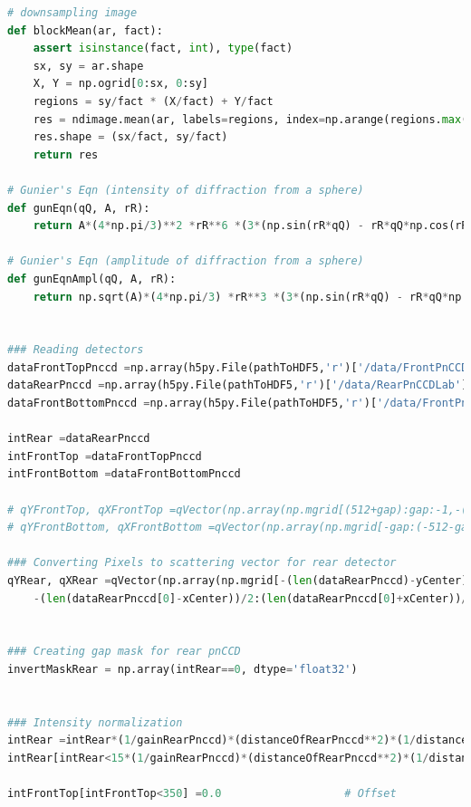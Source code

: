 \begin{lstlisting}[language=Python,frame=single,basicstyle=\footnotesize]
# downsampling image
def blockMean(ar, fact):
    assert isinstance(fact, int), type(fact)
    sx, sy = ar.shape
    X, Y = np.ogrid[0:sx, 0:sy]
    regions = sy/fact * (X/fact) + Y/fact
    res = ndimage.mean(ar, labels=regions, index=np.arange(regions.max() + 1))
    res.shape = (sx/fact, sy/fact)
    return res

# Gunier's Eqn (intensity of diffraction from a sphere)
def gunEqn(qQ, A, rR):
    return A*(4*np.pi/3)**2 *rR**6 *(3*(np.sin(rR*qQ) - rR*qQ*np.cos(rR*qQ))/(rR*qQ)**3)**2

# Gunier's Eqn (amplitude of diffraction from a sphere)
def gunEqnAmpl(qQ, A, rR):
    return np.sqrt(A)*(4*np.pi/3) *rR**3 *(3*(np.sin(rR*qQ) - rR*qQ*np.cos(rR*qQ))/(rR*qQ)**3)


### Reading detectors
dataFrontTopPnccd =np.array(h5py.File(pathToHDF5,'r')['/data/FrontPnCCDLab'])[0:512,0:1023]
dataRearPnccd =np.array(h5py.File(pathToHDF5,'r')['/data/RearPnCCDLab'])
dataFrontBottomPnccd =np.array(h5py.File(pathToHDF5,'r')['/data/FrontPnCCDLab'])[531:1043,0:1023]

intRear =dataRearPnccd
intFrontTop =dataFrontTopPnccd
intFrontBottom =dataFrontBottomPnccd

# qYFrontTop, qXFrontTop =qVector(np.array(np.mgrid[(512+gap):gap:-1,-(len(dataFrontTopPnccd[0]))/2:(len(dataFrontTopPnccd[0]))/2]),pixelSize=pixelSizePnccd, distanceToDetector=distanceOfFrontPnccd, waveLength=scatteredWaveLength)
# qYFrontBottom, qXFrontBottom =qVector(np.array(np.mgrid[-gap:(-512-gap):-1,-(len(dataFrontBottomPnccd[0]))/2:(len(dataFrontBottomPnccd[0]))/2]),pixelSize=pixelSizePnccd, distanceToDetector=distanceOfFrontPnccd, waveLength=scatteredWaveLength)

### Converting Pixels to scattering vector for rear detector
qYRear, qXRear =qVector(np.array(np.mgrid[-(len(dataRearPnccd)-yCenter)/2:(len(dataRearPnccd)+yCenter)/2,
    -(len(dataRearPnccd[0]-xCenter))/2:(len(dataRearPnccd[0]+xCenter))/2]),pixelSize=pixelSizePnccd, distanceToDetector=distanceOfRearPnccd, waveLength=scatteredWaveLength)


### Creating gap mask for rear pnCCD
invertMaskRear = np.array(intRear==0, dtype='float32')


### Intensity normalization
intRear =intRear*(1/gainRearPnccd)*(distanceOfRearPnccd**2)*(1/distanceOfFrontPnccd**2)
intRear[intRear<15*(1/gainRearPnccd)*(distanceOfRearPnccd**2)*(1/distanceOfFrontPnccd**2)] =0.0          # Offset

intFrontTop[intFrontTop<350] =0.0                   # Offset


\end{lstlisting}
